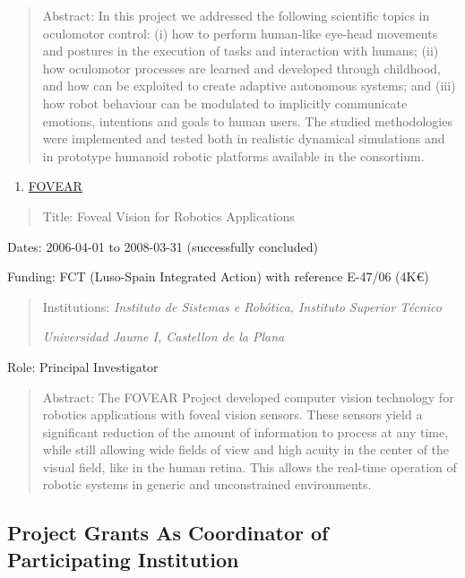 \documentclass[
]{article}
\begin{document}
\begin{quote}
Abstract: In this project we addressed the following scientific topics
in oculomotor control: (i) how to perform human-like eye-head movements
and postures in the execution of tasks and interaction with humans; (ii)
how oculomotor processes are learned and developed through childhood,
and how can be exploited to create adaptive autonomous systems; and
(iii) how robot behaviour can be modulated to implicitly communicate
emotions, intentions and goals to human users. The studied methodologies
were implemented and tested both in realistic dynamical simulations and
in prototype humanoid robotic platforms available in the consortium.
\end{quote}

\begin{enumerate}
\def\labelenumi{\arabic{enumi}.}
\setcounter{enumi}{7}
\item
  \ul{FOVEAR}
\end{enumerate}

\begin{quote}
Title: Foveal Vision for Robotics Applications
\end{quote}

Dates: 2006-04-01 to 2008-03-31 (successfully concluded)

Funding: FCT (Luso-Spain Integrated Action) with reference E-47/06 (4K€)

\begin{quote}
Institutions: \emph{Instituto de Sistemas e Robótica, Instituto Superior
Técnico}

\emph{Universidad Jaume I, Castellon de la Plana}
\end{quote}

Role: Principal Investigator

\begin{quote}
Abstract: The FOVEAR Project developed computer vision technology for
robotics applications with foveal vision sensors. These sensors yield a
significant reduction of the amount of information to process at any
time, while still allowing wide fields of view and high acuity in the
center of the visual field, like in the human retina. This allows the
real-time operation of robotic systems in generic and unconstrained
environments.
\end{quote}

\subsection{Project Grants As Coordinator of Participating
Institution}\label{project-grants-as-coordinator-of-participating-institution}
\end{document}
